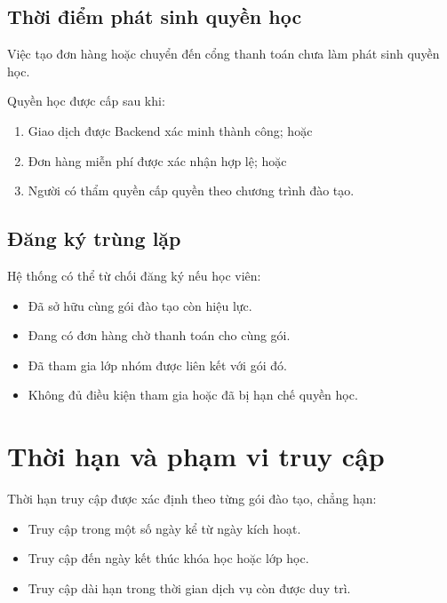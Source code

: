 \documentclass[12pt,a4paper]{article}
\begin{document}
\subsection{Thời điểm phát sinh quyền học}

Việc tạo đơn hàng hoặc chuyển đến cổng thanh toán chưa làm phát sinh quyền học.

Quyền học được cấp sau khi:

\begin{enumerate}
    \item Giao dịch được Backend xác minh thành công; hoặc
    \item Đơn hàng miễn phí được xác nhận hợp lệ; hoặc
    \item Người có thẩm quyền cấp quyền theo chương trình đào tạo.
\end{enumerate}

\subsection{Đăng ký trùng lặp}

Hệ thống có thể từ chối đăng ký nếu học viên:

\begin{itemize}
    \item Đã sở hữu cùng gói đào tạo còn hiệu lực.
    \item Đang có đơn hàng chờ thanh toán cho cùng gói.
    \item Đã tham gia lớp nhóm được liên kết với gói đó.
    \item Không đủ điều kiện tham gia hoặc đã bị hạn chế quyền học.
\end{itemize}

\section{Thời hạn và phạm vi truy cập}

Thời hạn truy cập được xác định theo từng gói đào tạo, chẳng hạn:

\begin{itemize}
    \item Truy cập trong một số ngày kể từ ngày kích hoạt.
    \item Truy cập đến ngày kết thúc khóa học hoặc lớp học.
    \item Truy cập dài hạn trong thời gian dịch vụ còn được duy trì.
\end{itemize}
\end{document}
